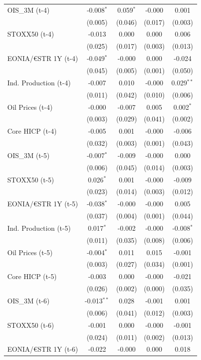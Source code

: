 \begin{longtable}[t]{lcccc}
OIS\_3M (t-4) & -0.008$^{*}$ & 0.059$^{*}$ & -0.000 & 0.001\\
 & (0.005) & (0.046) & (0.017) & (0.003)\\
STOXX50 (t-4) & -0.013 & 0.000 & 0.000 & 0.006\\
 & (0.025) & (0.017) & (0.003) & (0.013)\\
EONIA/€STR 1Y (t-4) & -0.049$^{*}$ & -0.000 & 0.000 & -0.024\\
 & (0.045) & (0.005) & (0.001) & (0.050)\\
Ind. Production (t-4) & -0.007 & 0.010 & -0.000 & 0.029$^{**}$\\
 & (0.011) & (0.042) & (0.010) & (0.006)\\
Oil Prices (t-4) & -0.000 & -0.007 & 0.005 & 0.002$^{*}$\\
 & (0.003) & (0.029) & (0.041) & (0.002)\\
Core HICP (t-4) & -0.005 & 0.001 & -0.000 & -0.006\\
 & (0.032) & (0.003) & (0.001) & (0.043)\\
OIS\_3M (t-5) & -0.007$^{*}$ & -0.009 & -0.000 & 0.000\\
 & (0.006) & (0.045) & (0.014) & (0.003)\\
STOXX50 (t-5) & 0.026$^{*}$ & 0.001 & -0.000 & -0.009\\
 & (0.023) & (0.014) & (0.003) & (0.012)\\
EONIA/€STR 1Y (t-5) & -0.038$^{*}$ & -0.000 & -0.000 & 0.005\\
 & (0.037) & (0.004) & (0.001) & (0.044)\\
Ind. Production (t-5) & 0.017$^{*}$ & -0.002 & -0.000 & -0.008$^{*}$\\
 & (0.011) & (0.035) & (0.008) & (0.006)\\
Oil Prices (t-5) & -0.004$^{*}$ & 0.011 & 0.015 & -0.001\\
 & (0.003) & (0.027) & (0.034) & (0.001)\\
Core HICP (t-5) & -0.003 & 0.000 & -0.000 & -0.021\\
 & (0.026) & (0.002) & (0.000) & (0.035)\\
OIS\_3M (t-6) & -0.013$^{**}$ & 0.028 & -0.001 & 0.001\\
 & (0.006) & (0.041) & (0.012) & (0.003)\\
STOXX50 (t-6) & -0.001 & 0.000 & -0.000 & -0.001\\
 & (0.024) & (0.011) & (0.002) & (0.013)\\
EONIA/€STR 1Y (t-6) & -0.022 & -0.000 & 0.000 & 0.018\\

\end{longtable}
